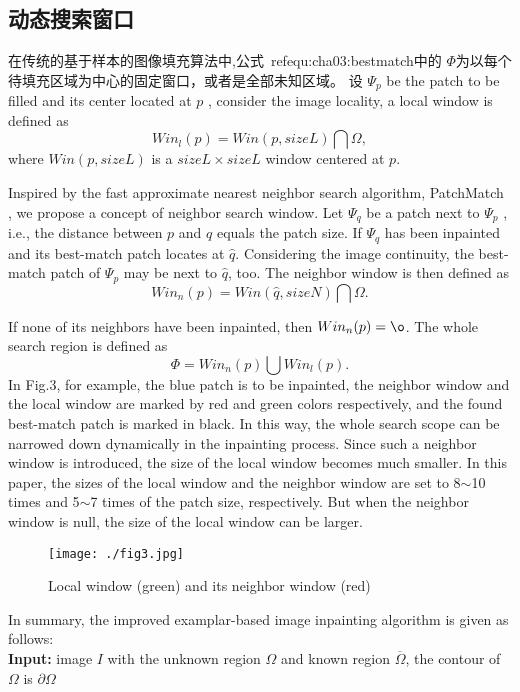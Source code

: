  \subsection{动态搜索窗口}
 \label{sec:sub:dynamicSearch}
 在传统的基于样本的图像填充算法中,公式~ref{equ:cha03:bestmatch}中的 \(\Phi\)为以每个待填充区域为中心的固定窗口\cite{LeMeur_2011}，或者是全部未知区域。 设 \(\Psi_p\) be the patch to be filled and its center located at \(p\) ,  consider the image locality, a local window is defined as
 $$Win_l(p)=Win(p,sizeL)\bigcap \Omega,$$
 where \(Win(p,sizeL)\) is a \(sizeL\times sizeL\) window centered at \( p\). \par Inspired by the fast approximate nearest neighbor search algorithm, PatchMatch \cite{Barnes:2009}, we propose a concept of neighbor search window. Let \(\Psi_q\) be a patch next to \(\Psi_p\)  , i.e., the distance between \(p\) and \(q\) equals the patch size. If \(\Psi_q\) has been inpainted and its best-match patch locates at \(\hat{q}\). Considering the image continuity, the best-match patch of \(\Psi_p\) may be next to \(\hat{q}\), too. The neighbor window is then defined as
 $$Win_n(p)=Win(\hat{q},sizeN)\bigcap\Omega.$$ \par
 If none of its neighbors have been inpainted, then \( Win_n(p)=\o \). The whole search region is defined as
 $$\Phi=Win_n(p)\bigcup Win_l(p).$$
 In Fig.3, for example, the blue patch is to be inpainted, the neighbor window and the local window are marked by red and green colors respectively, and the found best-match patch is marked in black. In this way, the whole search scope can be narrowed down dynamically in the inpainting process. Since such a neighbor window is introduced, the size of the local window becomes much smaller. In this paper, the sizes of the local window and the neighbor window are set to 8\(\sim\)10 times and 5\(\sim\)7 times of the patch size, respectively. But when the neighbor window is null, the size of the local window can be larger.\par
 \begin{figure}[!htbp]
 	\begin{center}
 			\texttt{[image: ./fig3.jpg]}
 	\end{center}
     \caption{Local window (green) and its neighbor window (red)}
 	\label{fig:3}
 \end{figure}
 In summary, the improved examplar-based image inpainting algorithm is given as follows:\\
 \textbf{Input:} image \(I\) with the unknown region \(\Omega \) and known region \(\overline{\Omega}\), the contour of \(\Omega \) is \(\partial \Omega\)\\
